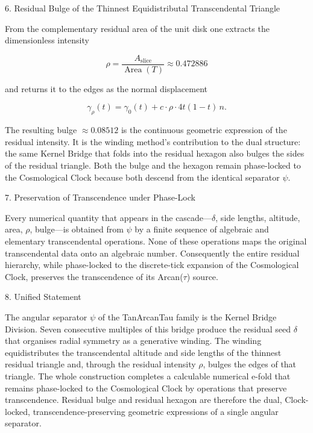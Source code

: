 6. Residual Bulge of the Thinnest Equidistributal Transcendental Triangle

From the complementary residual area of the unit disk one extracts the dimensionless intensity

\[
\rho=\frac{A_{\mathrm{slice}}}{\operatorname{Area}(T)}\approx0.472886
\]

and returns it to the edges as the normal displacement

\[
\gamma_\rho(t)=\gamma_0(t)+c\cdot\rho\cdot4t(1-t)\,n.
\]

The resulting bulge \(\approx0.08512\) is the continuous geometric expression of the residual intensity. It is the winding method’s contribution to the dual structure: the same Kernel Bridge that folds into the residual hexagon also bulges the sides of the residual triangle. Both the bulge and the hexagon remain phase-locked to the Cosmological Clock because both descend from the identical separator \(\psi\).

7. Preservation of Transcendence under Phase-Lock

Every numerical quantity that appears in the cascade—\(\delta\), side lengths, altitude, area, \(\rho\), bulge—is obtained from \(\psi\) by a finite sequence of algebraic and elementary transcendental operations. None of these operations maps the original transcendental data onto an algebraic number. Consequently the entire residual hierarchy, while phase-locked to the discrete-tick expansion of the Cosmological Clock, preserves the transcendence of its Arcan(\(\tau\)) source.

8. Unified Statement

The angular separator \(\psi\) of the TanArcanTau family is the Kernel Bridge Division. Seven consecutive multiples of this bridge produce the residual seed \(\delta\) that organises radial symmetry as a generative winding. The winding equidistributes the transcendental altitude and side lengths of the thinnest residual triangle and, through the residual intensity \(\rho\), bulges the edges of that triangle. The whole construction completes a calculable numerical e-fold that remains phase-locked to the Cosmological Clock by operations that preserve transcendence. Residual bulge and residual hexagon are therefore the dual, Clock-locked, transcendence-preserving geometric expressions of a single angular separator.
